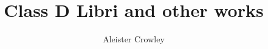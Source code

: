 \documentclass[paper=a5, fontsize=11pt, headings=openany, listof=totoc, pagesize=auto]{scrbook}
\begin{document}
\title{Class D Libri and other works}
\author{
  Aleister Crowley
}
\date{}

\frontmatter
\maketitle

\tableofcontents

\mainmatter
{}


\begin{Facing}
\end{Facing}





\end{document}
